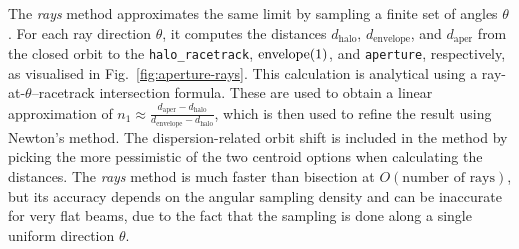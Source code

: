 The \emph{rays} method approximates the same limit by sampling a finite set of angles $\theta$.
For each ray direction $\theta$, it computes the distances $d_\mathrm{halo}$, $d_\mathrm{envelope}$, and $d_\mathrm{aper}$ from the closed orbit to the \verb|halo_racetrack|, $\text{\lstinline{envelope}}(1)$, and \verb|aperture|, respectively, as visualised in Fig.~\ref{fig:aperture-rays}.
This calculation is analytical using a ray-at-$\theta$--racetrack intersection formula.
These are used to obtain a linear approximation of $n_1 \approx \frac{d_\mathrm{aper} - d_\mathrm{halo}}{d_\mathrm{envelope} - d_\mathrm{halo}}$, which is then used to refine the result using Newton's method.
The dispersion-related orbit shift is included in the method by picking the more pessimistic of the two centroid options when calculating the distances.
The \emph{rays} method is much faster than bisection at $O(\text{number of rays})$, but its accuracy depends on the angular sampling density and can be inaccurate for very flat beams, due to the fact that the sampling is done along a single uniform direction $\theta$.

